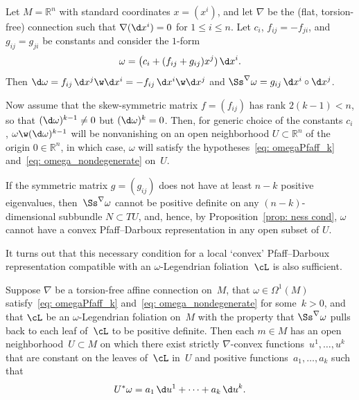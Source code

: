 \begin{Example}\label{ex: Obstruction}
Let $M=\mathbb{R}^n$ with standard coordinates $x=(x^i)$,
and let $\nabla$ be the (flat, torsion-free) connection
such that $\nabla(\d x^i)=0$ for $1\le i\le n$.
Let $c_i$, $f_{ij}=-f_{ji}$, and $g_{ij}=g_{ji}$
be constants and consider the $1$-form
\[
\omega = \bigl(c_i + (f_{ij}+g_{ij})x^j)\,\d x^i.
\]
Then $\d\omega= f_{ij}\,\d x^j\w\d x^i = - f_{ij}\,\d x^i\w\d x^j$
and $\Ss^\nabla\omega = g_{ij}\,\d x^i\circ\d x^j$.

Now assume that the skew-symmetric matrix $f = (f_{ij})$
has rank $2(k{-}1)<n$, so that $(\d\omega)^{k-1}\not=0$
but $(\d\omega)^{k}=0$.
Then, for generic choice of the constants $c_i$,
$\omega\w(\d\omega)^{k-1}$ will be nonvanishing on an open neighborhood $U\subset\mathbb{R}^n$ of the origin $0\in\mathbb{R}^n$,
in which case, $\omega$ will satisfy the hypotheses~\eqref{eq: omegaPfaff_k}
and~\eqref{eq: omega_nondegenerate} on~$U$.

If the symmetric matrix $g = (g_{ij})$
does not have at least $n{-}k$ positive eigenvalues,
then~$\Ss^\nabla\omega$ cannot be positive definite on
any $(n{-}k)$-dimensional subbundle $N\subset TU$, and, hence,
by Proposition~\ref{prop: ness cond}, $\omega$ cannot have a convex Pfaff--Darboux
representation in any open subset of $U$.
\end{Example}

It turns out that this necessary condition
for a local `convex' Pfaff--Darboux representation compatible
with an $\omega$-Legendrian foliation~$\cL$ is also sufficient.

\begin{Theorem}\label{thm: main}
Suppose $\nabla$ be a torsion-free affine
connection on~$M$, that $\omega\in\Omega^1(M)$
satisfy~\eqref{eq: omegaPfaff_k} and~\eqref{eq: omega_nondegenerate}
for some~$k>0$, and that $\cL$ be an $\omega$-Legendrian
foliation on~$M$ with the property that $\Ss^\nabla\omega$
pulls back to each leaf of~$\cL$ to be positive definite.
Then each $m\in M$ has an open neighborhood~$U\subset M$
on which there exist strictly $\nabla$-convex functions~$u^1,\ldots,u^k$
that are constant on the leaves of~$\cL$ in~$U$
and positive functions~$a_1,\ldots, a_k$ such that
\begin{equation*}
U^*\omega = a_1\,\d u^1 + \cdots + a_k\,\d u^k.
\end{equation*}
\end{Theorem}


